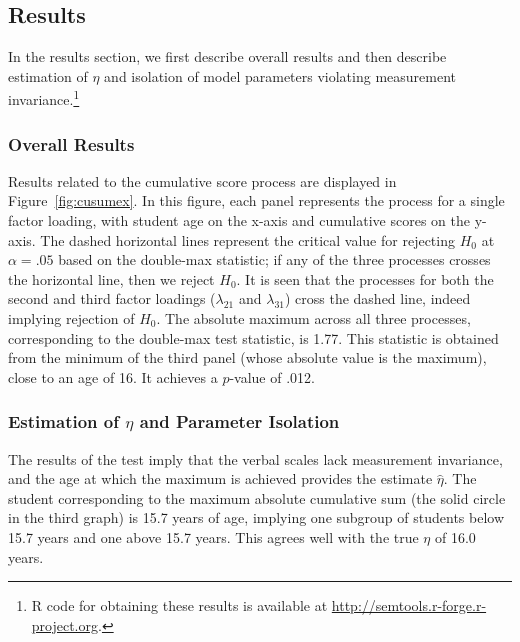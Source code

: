 \documentclass[man]{apa}
\begin{document}
\subsection{Results}
In the results section, we first describe overall results and then 
describe estimation of $\eta$ and 
isolation of model parameters violating
measurement invariance.\footnote{R code for obtaining these results is
  available at \url{http://semtools.r-forge.r-project.org}.}

\subsubsection{Overall Results}
Results related to the cumulative score process are displayed in
Figure~\ref{fig:cusumex}.  In this figure, each panel represents the
process for a single factor loading, with student age on the x-axis and
cumulative scores on the y-axis.  The dashed horizontal
lines represent the critical value for rejecting $H_0$ at $\alpha=.05$
based on the double-max statistic; if any of the three processes
crosses the horizontal line, then we reject $H_0$.  It is seen that
the processes for both the second and third factor loadings
($\lambda_{21}$ and $\lambda_{31}$) cross the dashed line, indeed
implying rejection of $H_0$.  The absolute maximum across all three processes,
corresponding to the double-max test statistic, is 1.77.  This
statistic is obtained from the minimum of the third
panel (whose absolute value is the maximum), close to an
age of 16.  It achieves a $p$-value of .012.



\subsubsection{Estimation of $\eta$ and Parameter Isolation}
The results of the test imply that the 
verbal scales lack measurement invariance, and the age at which the
maximum is achieved provides the estimate $\hat{\eta}$.
The student corresponding to the maximum
absolute cumulative sum (the solid circle in the third graph) is 15.7
years of age, implying one subgroup of 
students below 15.7 years and one above 15.7 years.  This agrees well
with the true $\eta$ of 16.0 years.
\end{document}
